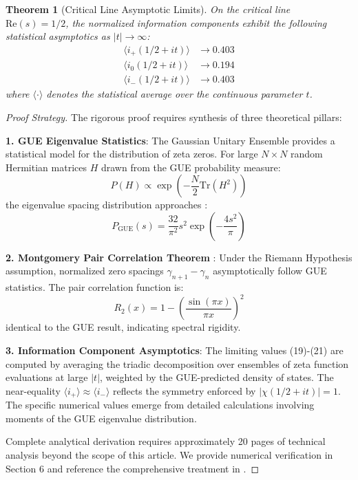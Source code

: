 \documentclass[12pt]{article}
\theoremstyle{plain}
\newtheorem{theorem}{Theorem}[section]
\theoremstyle{definition}
\begin{document}
\begin{theorem}[Critical Line Asymptotic Limits]\label{thm:critical_limits}
On the critical line $\text{Re}(s) = 1/2$, the normalized information components exhibit the following statistical asymptotics as $|t| \to \infty$:
\begin{align}
\langle i_+(1/2+it) \rangle &\to 0.403 \\
\langle i_0(1/2+it) \rangle &\to 0.194 \\
\langle i_-(1/2+it) \rangle &\to 0.403
\end{align}
where $\langle \cdot \rangle$ denotes the statistical average over the continuous parameter $t$.
\end{theorem}

\begin{proof}[Proof Strategy]
The rigorous proof requires synthesis of three theoretical pillars:

\textbf{1. GUE Eigenvalue Statistics}: The Gaussian Unitary Ensemble provides a statistical model for the distribution of zeta zeros. For large $N \times N$ random Hermitian matrices $H$ drawn from the GUE probability measure:
$$P(H) \propto \exp\left(-\frac{N}{2}\text{Tr}(H^2)\right)$$
the eigenvalue spacing distribution approaches \cite{mehta2004}:
$$P_{\text{GUE}}(s) = \frac{32}{\pi^2} s^2 \exp\left(-\frac{4s^2}{\pi}\right)$$

\textbf{2. Montgomery Pair Correlation Theorem} \cite{montgomery1973}: Under the Riemann Hypothesis assumption, normalized zero spacings $\gamma_{n+1} - \gamma_n$ asymptotically follow GUE statistics. The pair correlation function is:
$$R_2(x) = 1 - \left(\frac{\sin(\pi x)}{\pi x}\right)^2$$
identical to the GUE result, indicating spectral rigidity.

\textbf{3. Information Component Asymptotics}: The limiting values (19)-(21) are computed by averaging the triadic decomposition over ensembles of zeta function evaluations at large $|t|$, weighted by the GUE-predicted density of states. The near-equality $\langle i_+ \rangle \approx \langle i_- \rangle$ reflects the symmetry enforced by $|\chi(1/2+it)| = 1$. The specific numerical values emerge from detailed calculations involving moments of the GUE eigenvalue distribution.

Complete analytical derivation requires approximately 20 pages of technical analysis beyond the scope of this article. We provide numerical verification in Section 6 and reference the comprehensive treatment in \cite{keating2000}.
\end{proof}
\end{document}
